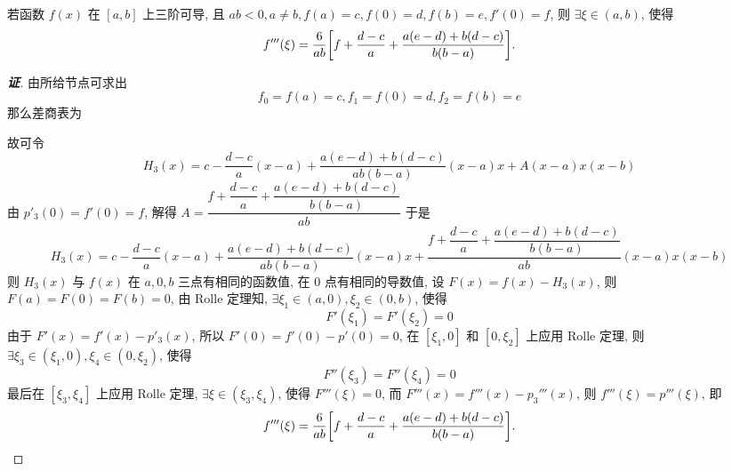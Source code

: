 \begin{theorem}
    若函数 $f(x)\text{ 在 }[a,b]$ 上三阶可导, 且 $ab<0,a\neq b,f(a)=c,f(0)=d,f(b)=e,f'(0)=f$, 则 $\exists\xi\in(a,b)$, 使得 $$f'''(\xi)=\dfrac{6}{ab}\qty[f+\dfrac{d-c}{a}+\dfrac{a(e-d)+b(d-c)}{b(b-a)}].$$
\end{theorem}
\begin{proof}[{\songti \textbf{证}}]
    由所给节点可求出 $$f_0=f(a)=c,f_1=f(0)=d,f_2=f(b)=e$$
    那么差商表为
    \begin{table}[H]
        \centering
    \end{table}
    故可令 $$H_3(x)=c-\dfrac{d-c}{a}(x-a)+\dfrac{a(e-d)+b(d-c)}{ab(b-a)}(x-a)x+A(x-a)x(x-b)$$
    由 $p'_3(0)=f'(0)=f$, 解得 $A=\dfrac{f+\dfrac{d-c}{a}+\dfrac{a(e-d)+b(d-c)}{b(b-a)}}{ab}$
    于是 $$H_3(x)=c-\dfrac{d-c}{a}(x-a)+\dfrac{a(e-d)+b(d-c)}{ab(b-a)}(x-a)x+\dfrac{f+\dfrac{d-c}{a}+\dfrac{a(e-d)+b(d-c)}{b(b-a)}}{ab}(x-a)x(x-b)$$
    则 $H_3(x)$ 与 $f(x)$ 在 $a,0,b$ 三点有相同的函数值, 在 $0$ 点有相同的导数值, 
    设 $F(x)=f(x)-H_3(x)$, 则 $F(a)=F(0)=F(b)=0$, 由 Rolle 定理知, $\exists\xi_1\in(a,0),\xi_2\in(0,b)$, 使得 $$F'(\xi_1)=F'(\xi_2)=0$$
    由于 $F'(x)=f'(x)-p'_3(x)$, 所以 $F'(0)=f'(0)-p'(0)=0$, 在 $[\xi_1,0]$ 和 $[0,\xi_2]$ 上应用 Rolle 定理, 则 $\exists\xi_3\in(\xi_1,0),\xi_4\in(0,\xi_2)$, 使得 $$F''(\xi_3)=F''(\xi_4)=0$$
    最后在 $[\xi_3,\xi_4]$ 上应用 Rolle 定理, $\exists\xi\in(\xi_3,\xi_4)$, 使得 $F'''(\xi)=0$, 而 $F'''(x)=f'''(x)-p_3'''(x)$, 则 $f'''(\xi)=p'''(\xi)$, 即
    $$f'''(\xi)=\dfrac{6}{ab}\qty[f+\dfrac{d-c}{a}+\dfrac{a(e-d)+b(d-c)}{b(b-a)}].$$
\end{proof}
